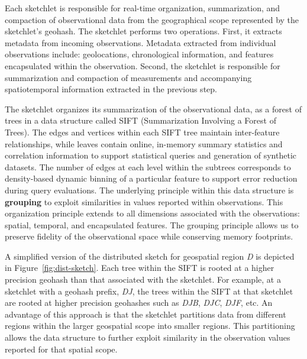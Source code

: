 Each sketchlet is responsible for real-time organization, summarization, and compaction of observational data from the geographical scope represented by the sketchlet's geohash.  The sketchlet performs two operations. First, it extracts metadata from incoming observations. Metadata extracted from individual observations include: geolocations, chronological information, and features encapsulated within the observation. Second, the sketchlet is responsible for summarization and compaction of measurements and accompanying spatiotemporal information extracted in the previous step.

The sketchlet organizes its summarization of the observational data, as a forest of trees in a data structure called SIFT (Summarization Involving a Forest of Trees). The edges and vertices within each SIFT tree maintain inter-feature relationships, while leaves contain online, in-memory summary statistics and correlation information to support statistical queries and generation of synthetic datasets.  The number of edges at each level within the subtrees corresponds to density-based dynamic binning of a particular feature to support error reduction during query evaluations. The underlying principle within this data structure is \textbf{grouping} to exploit similarities in values reported within observations. This organization principle extends to all dimensions associated with the observations: spatial, temporal, and encapsulated features. The grouping principle allows us to preserve fidelity of the observational space while conserving memory footprints.

A simplified version of the distributed sketch for geospatial region \emph{D} is depicted in Figure~\ref{fig:dist-sketch}. 
Each tree within the SIFT is rooted at a higher precision geohash than that associated with the sketchlet. For example, at a sketchlet with a geohash prefix, \emph{DJ}, the trees within the SIFT at that sketchlet are rooted at higher precision geohashes such as \emph{DJB}, \emph{DJC}, \emph{DJF}, etc. An advantage of this approach is that the sketchlet partitions data from different regions within the larger geospatial scope into smaller regions. This partitioning allows the data structure to further exploit similarity in the observation values reported for that spatial scope. 

